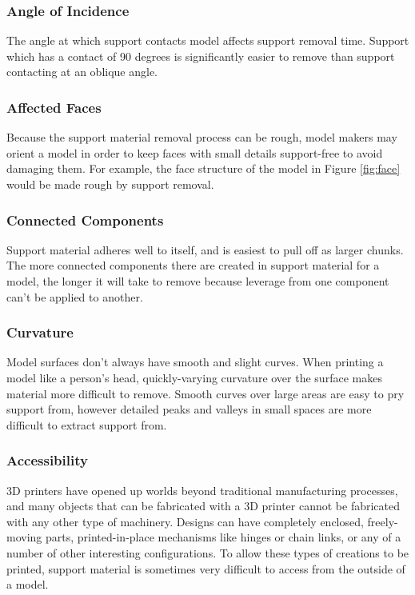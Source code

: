 \documentclass{sigchi}
\begin{document}
\subsubsection{Angle of Incidence}
The angle at which support contacts model affects support removal time.  Support which has a contact of 90 degrees is significantly easier to remove than support contacting at an oblique angle.

\subsubsection{Affected Faces}
Because the support material removal process can be rough, model makers may orient a model in order to keep faces with small details support-free to avoid damaging them.  For example, the face structure of the model in Figure \ref{fig:face} would be made rough by support removal.

\subsubsection{Connected Components}
Support material adheres well to itself, and is easiest to pull off as larger chunks.  The more connected components there are created in support material for a model, the longer it will take to remove because leverage from one component can't be applied to another.

\subsubsection{Curvature}
Model surfaces don't always have smooth and slight curves.  When printing a model like a person's head, quickly-varying curvature over the surface makes material more difficult to remove.  Smooth curves over large areas are easy to pry support from, however detailed peaks and valleys in small spaces are more difficult to extract support from.

\subsubsection{Accessibility}
3D printers have opened up worlds beyond traditional manufacturing processes, and many objects that can be fabricated with a 3D printer cannot be fabricated with any other type of machinery.  Designs can have completely enclosed, freely-moving parts, printed-in-place mechanisms like hinges or chain links, or any of a number of other interesting configurations.  To allow these types of creations to be printed, support material is sometimes very difficult to access from the outside of a model.
\end{document}
